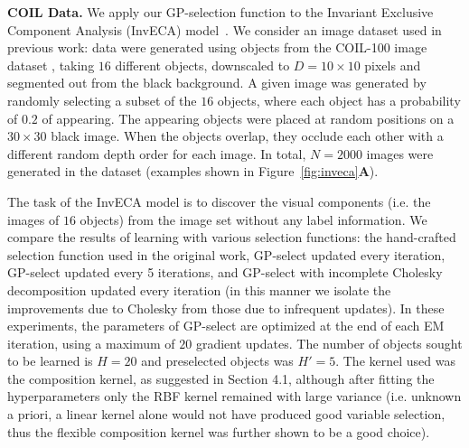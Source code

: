 
\textbf{COIL Data.}
We apply our GP-selection function to the Invariant Exclusive Component Analysis (InvECA) model~\citep{DaiEtAl2013}.
We consider an image dataset used in previous work: data were generated using objects from the COIL-100 image dataset \citep{coil100}, taking $16$ different objects, downscaled to $D=10 \times 10$ pixels and segmented out from the black background.
A given image was generated by randomly selecting a subset of the $16$ objects, where each object has a probability of $0.2$ of appearing.
The appearing objects were placed at random positions on a $30 \times 30$ black image.
When the objects overlap, they occlude each other with a different random depth order for each image.
In total, $N=2000$ images were generated in the dataset (examples shown in Figure~\ref{fig:inveca}\textbf{A}).

The task of the InvECA model is to discover the visual components (i.e. the images of $16$ objects) from the image set without any label information. We compare the results of learning with various selection functions: the hand-crafted selection function used in the original work, GP-select updated every iteration, GP-select updated every 5 iterations, and GP-select with incomplete Cholesky decomposition updated every iteration (in this manner we isolate the improvements due to Cholesky from those due to infrequent updates). 
In these experiments, the parameters of GP-select are optimized at the end of each EM iteration, using a maximum of $20$ gradient updates.
The number of objects sought to be learned is $H=20$ and preselected objects was $H'=5$.
The kernel used was the composition kernel, as suggested in Section 4.1, although after fitting the hyperparameters only the RBF kernel remained with large variance (i.e. unknown a priori, a linear kernel alone would not have produced good variable selection, thus the flexible composition kernel was further shown to be a good choice).


